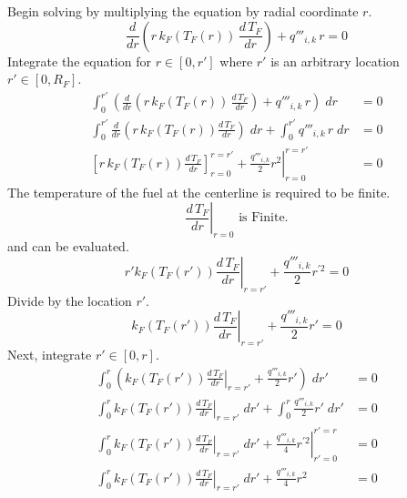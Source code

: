       Begin solving  by multiplying the
      equation by radial coordinate $r$.
      \begin{equation}
        \frac{d}{dr} \left( r\, k_F(T_F(r)) \, \frac{d\, T_F}{dr} 
          \right) + q'''_{i,k} \, r = 0
      \end{equation}
      Integrate the equation for $r \in [0,r']$ where $r'$ is an arbitrary
      location $r' \in [0,R_F]$.
      \begin{align}
        \int_0^{r'} \left( \frac{d}{dr} \left( r\, k_F(T_F(r)) \, 
          \frac{d\, T_F}{dr} \right) + q'''_{i,k}\,r \right) \; dr &= 0 \\
        \int_0^{r'} \frac{d}{dr} \left( r\, k_F(T_F(r)) 
          \frac{d \, T_F}{dr} \right) \; dr + 
          \int_0^{r'} q'''_{i,k} \,r \; dr &= 0 \\
        \label{eq:need_bc}
        \left[ r \, k_F(T_F(r)) \frac{d\,T_F}{dr} \right]_{r=0}^{r=r'} + 
          \left. \frac{q'''_{i,k}}{2} r^2 \right|_{r=0}^{r=r'} &= 0 
      \end{align}
      The temperature of the fuel at the centerline is required to be finite.
      \begin{equation}
        \left. \frac{d \, T_F}{dr} \right|_{r=0} \text{ is Finite}.
      \end{equation}
      and  can be evaluated.
      \begin{equation}
        \label{eq:dtdr_fuel}
        \left. r' k_F(T_F(r')) \frac{d\,T_F}{dr} \right|_{r=r'} + 
          \frac{q'''_{i,k}}{2} r^{\prime 2} = 0
      \end{equation}
      Divide by the location $r'$.
      \begin{equation}
        \left. k_F(T_F(r')) \frac{d \, T_F}{dr}\right|_{r=r'} + 
          \frac{q'''_{i,k}}{2} r' = 0
      \end{equation}
      Next, integrate $r' \in [0,r]$.
      \begin{align}
        \int_0^r \left( k_F(T_F(r')) \left. \frac{d\,T_F}{dr}\right|_{r=r'} 
          + \frac{q'''_{i,k}}{2} r' \right) \; dr' &= 0 \\
        \int_0^r k_F(T_F(r')) \left. \frac{d\,T_F}{dr}\right|_{r=r'} \; dr' + 
          \int_0^r \frac{q'''_{i,k}}{2} r' \; dr' &= 0 \\
        \int_0^r k_F(T_F(r')) \left. \frac{d\,T_F}{dr}\right|_{r=r'} \; dr' + 
          \left. \frac{q'''_{i,k}}{4} r^{\prime 2} \right|_{r'=0}^{r'=r} &= 0 \\
        \int_0^r k_F(T_F(r')) \left. \frac{d\,T_F}{dr}\right|_{r=r'} \; dr' + 
          \frac{q'''_{i,k}}{4} r^2 &= 0
      \end{align}
